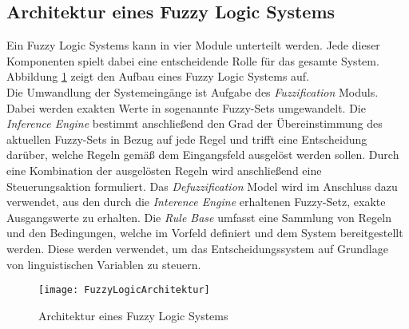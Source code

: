 \subsection{Architektur eines Fuzzy Logic Systems}
Ein Fuzzy Logic Systems kann in vier Module unterteilt werden. Jede dieser Komponenten spielt dabei eine entscheidende Rolle für das gesamte System. 
Abbildung \ref{fig:FuzzyLogicArchitektur} zeigt den Aufbau eines Fuzzy Logic Systems auf.\\
Die Umwandlung der Systemeingänge ist Aufgabe des \textit{Fuzzification} Moduls. Dabei werden exakten Werte in sogenannte Fuzzy-Sets umgewandelt. Die \textit{Inference Engine} bestimmt anschließend den Grad der Übereinstimmung des aktuellen Fuzzy-Sets in Bezug auf jede Regel und trifft eine Entscheidung darüber, welche Regeln gemäß dem Eingangsfeld ausgelöst werden sollen. Durch eine Kombination der ausgelösten Regeln wird anschließend eine Steuerungsaktion formuliert. Das \textit{Defuzzification} Model wird im Anschluss dazu verwendet, aus den durch die \textit{Interence Engine} erhaltenen Fuzzy-Setz, exakte Ausgangswerte zu erhalten.
Die \textit{Rule Base} umfasst eine Sammlung von Regeln und den  Bedingungen, welche im Vorfeld definiert und dem System bereitgestellt werden. Diese werden verwendet, um das Entscheidungssystem auf Grundlage von linguistischen Variablen zu steuern. \cite{FuzzyLogicGeeks}\\
\vspace{-1.5cm}
\begin{center}
    \begin{figure}[h]
     \centering
     \texttt{[image: FuzzyLogicArchitektur]}
     \caption{Architektur eines Fuzzy Logic Systems \cite{FuzzyLogicGeeks}}
     \label{fig:FuzzyLogicArchitektur}
    \end{figure}
   \end{center}


